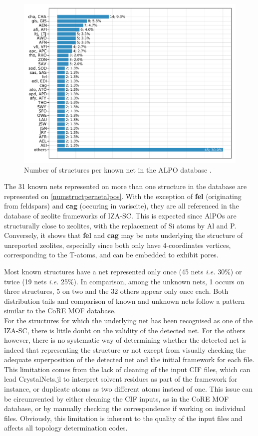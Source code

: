 \documentclass[main.tex]{subfiles}
\begin{document}
\begin{figure}[t]
	\centering
	\includegraphics[width=\linewidth]{figures/topology/numstructpernetalpos.pdf}
	\caption{Number of structures per known net in the ALPO database \autocite{ALPO}.}
	\label{numstructpernetalpos}
\end{figure}

The 31 known nets represented on more than one structure in the database are represented on \autoref{numstructpernetalpos}. With the exception of \textbf{fel} (originating from feldspars) and \textbf{cag} (occuring in variscite), they are all referenced in the database of zeolite frameworks of IZA-SC. This is expected since AlPOs are structurally close to zeolites, with the replacement of Si atoms by Al and P. Conversely, it shows that \textbf{fel} and \textbf{cag} may be nets underlying the structure of unreported zeolites, especially since both only have 4-coordinates vertices, corresponding to the T-atoms, and can be embedded to exhibit pores.

Most known structures have a net represented only once (45 nets \textit{i.e.} {30\%}) or twice (19 nets \textit{i.e.} {25\%}). In comparison, among the unknown nets, 1 occurs on three structures, 5 on two and the 32 others appear only once each. Both distribution tails and comparison of known and unknown nets follow a pattern similar to the CoRE MOF database.\\

For the structures for which the underlying net has been recognised as one of the IZA-SC, there is little doubt on the validity of the detected net. For the others however, there is no systematic way of determining whether the detected net is indeed that representing the structure or not except from visually checking the adequate superposition of the detected net and the initial framework for each file. This limitation comes from the lack of cleaning of the input CIF files, which can lead CrystalNets.jl to interpret solvent residues as part of the framework for instance, or duplicate atoms as two different atoms instead of one. This issue can be circumvented by either cleaning the CIF inputs, as in the CoRE MOF database, or by manually checking the correspondence if working on individual files. Obviously, this limitation is inherent to the quality of the input files and affects all topology determination codes.
\end{document}
